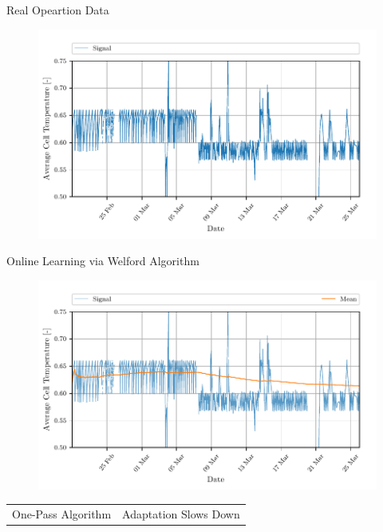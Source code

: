 \documentclass[aspectratio=169]{beamer}
\begin{document}
\begin{frame}{Real Opeartion Data}
    \begin{figure}
        \begin{center}
            \includegraphics[width=0.62\linewidth]{../ilustrate/pc2023/bess/all_signal.pdf}
        \end{center}
    \end{figure}
\end{frame}


\begin{frame}{Online Learning via Welford Algorithm}
    \begin{figure}
        \begin{center}
            \includegraphics[width=0.62\linewidth]{../ilustrate/pc2023/bess/mean_signal.pdf}
        \end{center}
    \end{figure}
    \begin{table}
        \centering
        \begin{tabular}{c|c}
            {\color{green}{$+$}} One-Pass Algorithm & {\color{red}{$-$}} Adaptation Slows Down \\
        \end{tabular}
    \end{table}
\end{frame}
\end{document}
